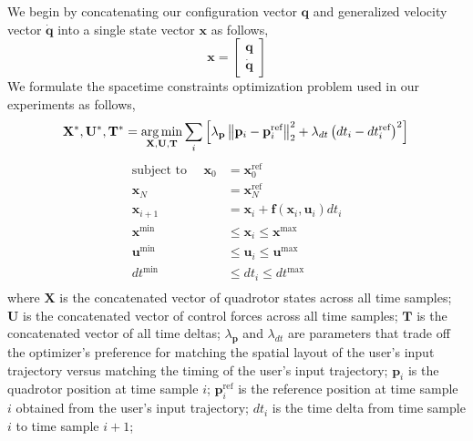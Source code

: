 We begin by concatenating our configuration vector $\mathbf{q}$ and generalized velocity vector $\dot{\mathbf{q}}$ into a single state vector $\mathbf{x}$ as follows,
%
\begin{equation}
\mathbf{x} = 
\begin{bmatrix}
\mathbf{q} \\
\dot{\mathbf{q}}
\end{bmatrix}
\end{equation}
%
We formulate the spacetime constraints optimization problem used in our experiments as follows,
%
\begin{equation*}
\mathbf{X}^{*},\mathbf{U}^{*},\mathbf{T}^* = \operatorname*{arg\,min}_{\mathbf{X},\mathbf{U},\mathbf{T}} \sum_i \left[\lambda_\mathbf{p} \left\Vert \mathbf{p}_i - \mathbf{p}_i^{\text{ref}} \right\Vert_2^2 + \lambda_{dt} \left(dt_i - dt_i^{\text{ref}} \right)^2\right]\\
\end{equation*}
%
\begin{equation}
\begin{aligned}
\text{subject to~~~~}
\mathbf{x}_{0}   & = \mathbf{x}_{0}^{\text{ref}}\\
\mathbf{x}_{N}   & = \mathbf{x}_{N}^{\text{ref}}\\
\mathbf{x}_{i+1} & = \mathbf{x}_{i} +\mathbf{f}(\mathbf{x}_{i},\mathbf{u}_{i})dt_i\\
\mathbf{x}^{\text{min}}  & \leq \mathbf{x}_i  \leq \mathbf{x}^{\text{max}}\\
\mathbf{u}^{\text{min}}  & \leq \mathbf{u}_i  \leq \mathbf{u}^{\text{max}}\\
dt^{\text{min}}          & \leq dt_i          \leq dt^{\text{max}}\\
\end{aligned}
\label{eqn:ch3:spacetime}
\end{equation}
%
where
$\mathbf{X}$ is the concatenated vector of quadrotor states across all time samples;
$\mathbf{U}$ is the concatenated vector of control forces across all time samples;
$\mathbf{T}$ is the concatenated vector of all time deltas;
$\lambda_\mathbf{p}$ and $\lambda_{dt}$ are parameters that trade off the optimizer's preference for matching the spatial layout of the user's input trajectory versus matching the timing of the user's input trajectory;
$\mathbf{p}_i$ is the quadrotor position at time sample $i$;
$\mathbf{p}_i^{\text{ref}}$ is the reference position at time sample $i$ obtained from the user's input trajectory;
$dt_i$ is the time delta from time sample $i$ to time sample $i+1$; 
